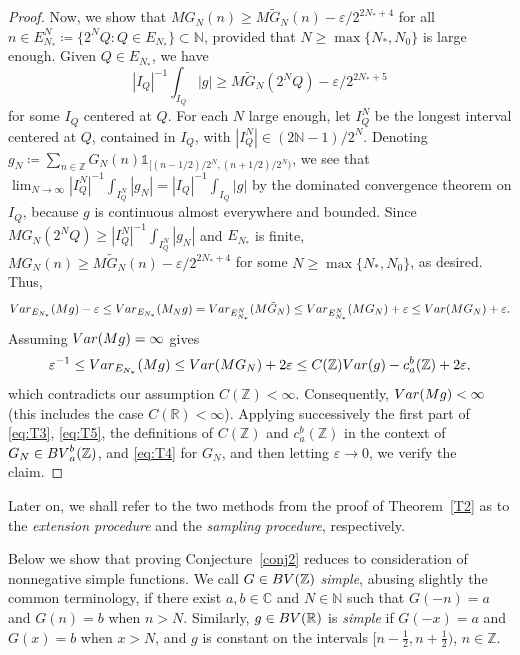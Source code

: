 \documentclass[leqno,11pt]{amsart}
\numberwithin{equation}{section}
\numberwithin{theorem}{section}
\newcommand{\RR}{\mathbb{R}}
\newcommand{\ZZ}{\mathbb{Z}}
\newcommand{\CC}{\mathbb{C}}
\newcommand{\NN}{\mathbb{N}}
\newcommand{\Var}{{\rm Var}}
\newcommand{\BV}{{\rm BV}}
\newcommand{\ind}[1]{{\mathds{1}_{{#1}}}}
\begin{document}
\begin{proof}
	Now, we show that $MG_N(n) \geq M\tilde G_N(n) - \varepsilon / 2^{2N_*+4}$ for all $n \in E_{N_*}^N \coloneqq \{2^N Q : Q \in E_{N_*}\} \subset \NN$, provided that $N \geq \max\{N_*, N_0\}$ is large enough. 
	Given $Q \in E_{N_*}$, we have 
	\[
	|I_Q|^{-1} \int_{I_Q} |g| \geq M\tilde G_N(2^N Q) - \varepsilon / 2^{2N_*+5}
	\] 
	for some $I_Q$ centered at $Q$. For each $N$ large enough, let $I_Q^N$ be the longest interval centered at $Q$, contained in $I_Q$, with $|I_Q^N| \in (2\NN - 1)/2^N$. Denoting $g_N \coloneqq \sum_{n \in \ZZ} G_N(n) \ind{[(n-1/2)/2^N, (n+1/2)/2^N)}$, we see that $\lim_{N \to \infty} |I_Q^N|^{-1} \int_{I_Q^N} |g_N| = |I_Q|^{-1} \int_{I_Q} |g|$ by the dominated convergence theorem on $I_Q$, because $g$ is continuous almost everywhere and bounded.  
	Since $MG_N(2^N Q) \geq |I_Q^N|^{-1} \int_{I_Q^N} |g_N|$ and $E_{N_*}$ is finite, $MG_N(n) \geq M\tilde G_N(n) - \varepsilon / 2^{2N_*+4}$ for some $N \geq \max\{N_*, N_0\}$, as desired. Thus,
	\begin{equation} \label{eq:T5}
	\Var_{E_{N_*}} (M g) - \varepsilon
	\leq 
	\Var_{E_{N_*}}(M_{N}g) = \Var_{E_{N_*}^N}(M \tilde G_N) \leq
	\Var_{E_{N_*}^N}(M G_N) + \varepsilon
	\leq \Var(M G_N) + \varepsilon.
	\end{equation}
	Assuming $\Var(Mg)=\infty$ gives
	\[
	\varepsilon^{-1} \le \Var_{E_{N_*}} (M g) \le \Var(MG_N) + 2\varepsilon \le C(\ZZ)\Var(g)-c_a^b(\ZZ) + 2\varepsilon,
	\]
	which contradicts our assumption $C(\ZZ)<\infty$. Consequently, $\Var(Mg)<\infty$ (this includes the case $C(\RR)<\infty$). Applying successively
	the first part of \eqref{eq:T3}, \eqref{eq:T5}, the definitions of $C(\ZZ)$ and $c_a^b(\ZZ)$ in the context of $G_N \in \BV_a^b(\ZZ)$, and \eqref{eq:T4} for $G_N$, and then letting $\varepsilon \to 0$, we verify the claim.
	\end{proof}

	Later on, we shall refer to the two methods from the proof of Theorem~\ref{T2} as to the \emph{extension procedure} and the \emph{sampling procedure}, respectively.
	
	Below we show that proving Conjecture~\ref{conj2} reduces to consideration of nonnegative simple functions.
	We call $G \in \BV(\ZZ)$ \emph{simple}, abusing
	slightly the common terminology, if there exist $a,b\in\CC$ and $N \in \NN$ such that $G(-n) = a$ and $G(n) = b$ when $n > N$. Similarly, $g \in \BV(\RR)$ is \emph{simple} if $G(-x) = a$ and $G(x) = b$ when $x > N$, and $g$ is constant on the intervals $[n-\frac{1}{2},n+\frac{1}{2})$, $n \in \ZZ$.
	 
\end{document}
